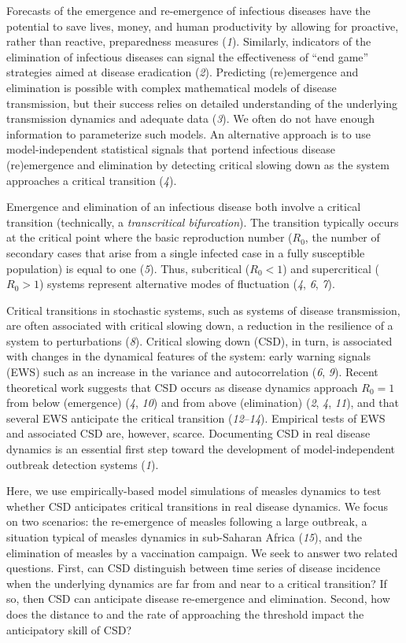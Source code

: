 \documentclass[3p]{elsarticle} %
\begin{document}
Forecasts of the emergence and re-emergence of infectious diseases have
the potential to save lives, money, and human productivity by allowing
for proactive, rather than reactive, preparedness measures (\emph{1}).
Similarly, indicators of the elimination of infectious diseases can
signal the effectiveness of ``end game'' strategies aimed at disease
eradication (\emph{2}). Predicting (re)emergence and elimination is
possible with complex mathematical models of disease transmission, but
their success relies on detailed understanding of the underlying
transmission dynamics and adequate data (\emph{3}). We often do not have
enough information to parameterize such models. An alternative approach
is to use model-independent statistical signals that portend infectious
disease (re)emergence and elimination by detecting critical slowing down
as the system approaches a critical transition (\emph{4}).

Emergence and elimination of an infectious disease both involve a
critical transition (technically, a \emph{transcritical bifurcation}).
The transition typically occurs at the critical point where the basic
reproduction number (\(R_0\), the number of secondary cases that arise
from a single infected case in a fully susceptible population) is equal
to one (\emph{5}). Thus, subcritical (\(R_0 < 1\)) and supercritical
(\(R_0 > 1\)) systems represent alternative modes of fluctuation
(\emph{4}, \emph{6}, \emph{7}).

Critical transitions in stochastic systems, such as systems of disease
transmission, are often associated with critical slowing down, a
reduction in the resilience of a system to perturbations (\emph{8}).
Critical slowing down (CSD), in turn, is associated with changes in the
dynamical features of the system: early warning signals (EWS) such as an
increase in the variance and autocorrelation (\emph{6}, \emph{9}).
Recent theoretical work suggests that CSD occurs as disease dynamics
approach \(R_0 = 1\) from below (emergence) (\emph{4}, \emph{10}) and
from above (elimination) (\emph{2}, \emph{4}, \emph{11}), and that
several EWS anticipate the critical transition (\emph{12}--\emph{14}).
Empirical tests of EWS and associated CSD are, however, scarce.
Documenting CSD in real disease dynamics is an essential first step
toward the development of model-independent outbreak detection systems
(\emph{1}).

Here, we use empirically-based model simulations of measles dynamics to
test whether CSD anticipates critical transitions in real disease
dynamics. We focus on two scenarios: the re-emergence of measles
following a large outbreak, a situation typical of measles dynamics in
sub-Saharan Africa (\emph{15}), and the elimination of measles by a
vaccination campaign. We seek to answer two related questions. First,
can CSD distinguish between time series of disease incidence when the
underlying dynamics are far from and near to a critical transition? If
so, then CSD can anticipate disease re-emergence and elimination.
Second, how does the distance to and the rate of approaching the
threshold impact the anticipatory skill of CSD?
\end{document}
